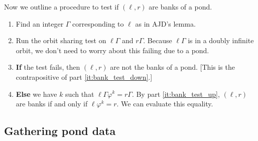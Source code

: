 \documentclass[12pt]{article}
\let\phi\varphi
\newcommand\alert\textbf
\begin{document}
Now we outline a procedure to test if $(\ell, r)$ are banks of a pond.
\begin{enumerate}
	\item Find an integer $\Gamma$ corresponding to $\ell$ as in AJD's lemma.
	\item Run the orbit sharing test on $\ell\Gamma$ and $r\Gamma$. Because $\ell\Gamma$ is in a doubly infinite orbit, we don't need to worry about this failing due to a pond.
	\item \alert{If} the test fails, then $(\ell, r)$ are not the banks of a pond. [This is the contrapositive of part \ref{it:bank_test_down}.]
	\item \alert{Else} we have $k$ such that $\ell\Gamma\phi^k = r \Gamma$. By part \ref{it:bank_test_up}, $(\ell, r)$ are banks if and only if $\ell\phi^k=r$. We can evaluate this equality.

\end{enumerate}

\subsection{Gathering pond data}
\end{document}
